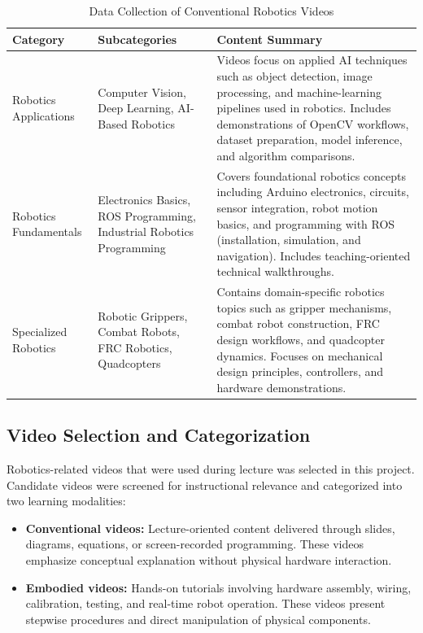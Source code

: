 \begin{table}[ht]
    \centering
    \caption{Data Collection of Conventional Robotics Videos}
    \begin{tabular}{p{3cm} p{3cm} p{7cm}}
        \toprule
        \textbf{Category} & \textbf{Subcategories} & \textbf{Content Summary} \\
        \midrule
        
        Robotics Applications 
        & Computer Vision, Deep Learning, AI-Based Robotics 
        & Videos focus on applied AI techniques such as object detection, image processing, and machine-learning pipelines used in robotics. Includes demonstrations of OpenCV workflows, dataset preparation, model inference, and algorithm comparisons. \\[6pt]
        
        Robotics Fundamentals
        & Electronics Basics, ROS Programming, Industrial Robotics Programming 
        & Covers foundational robotics concepts including Arduino electronics, circuits, sensor integration, robot motion basics, and programming with ROS (installation, simulation, and navigation). Includes teaching-oriented technical walkthroughs. \\[6pt]
        
        Specialized Robotics
        & Robotic Grippers, Combat Robots, FRC Robotics, Quadcopters 
        & Contains domain-specific robotics topics such as gripper mechanisms, combat robot construction, FRC design workflows, and quadcopter dynamics. Focuses on mechanical design principles, controllers, and hardware demonstrations. \\
        
        \bottomrule
    \end{tabular}
    \label{tab:categorized_videos}
\end{table}

\subsection{Video Selection and Categorization}

Robotics-related videos that were used during lecture was selected in this project. Candidate videos were screened for instructional relevance and categorized into two learning modalities:

\begin{itemize}
\item \textbf{Conventional videos:} Lecture-oriented content delivered through slides, diagrams, equations, or screen-recorded programming. These videos emphasize conceptual explanation without physical hardware interaction.
\item \textbf{Embodied videos:} Hands-on tutorials involving hardware assembly, wiring, calibration, testing, and real-time robot operation. These videos present stepwise procedures and direct manipulation of physical components.
\end{itemize}

